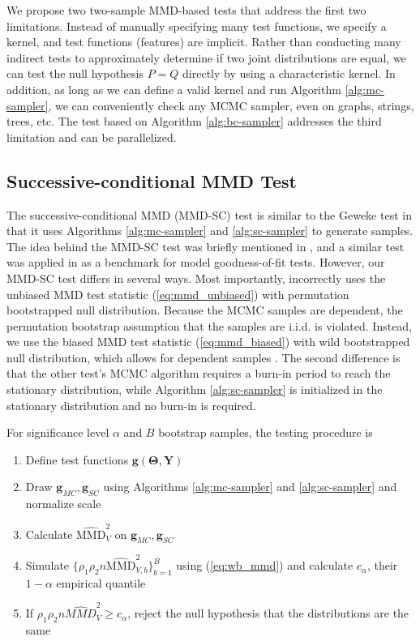 \documentclass[a4paper,11pt]{article}
\begin{document}
We propose two two-sample MMD-based tests that address the first two limitations. Instead of manually specifying many test functions, we specify a kernel, and test functions (features) are implicit. Rather than conducting many indirect tests to approximately determine if two joint distributions are equal, we can test the null hypothesis $P=Q$ directly by using a characteristic kernel. In addition, as long as we can define a valid kernel and run Algorithm \ref{alg:mc-sampler}, we can conveniently check any MCMC sampler, even on graphs, strings, trees, etc. The test based on Algorithm \ref{alg:bc-sampler} addresses the third limitation and can be parallelized.

\subsection{Successive-conditional MMD Test}
The successive-conditional MMD (MMD-SC) test is similar to the Geweke test in that it uses Algorithms \ref{alg:mc-sampler} and \ref{alg:sc-sampler} to generate samples. The idea behind the MMD-SC test was briefly mentioned in \cite{lloyd_statistical_nodate}, and a similar test was applied in \cite{liu_kernelized_nodate} as a benchmark for model goodness-of-fit tests. However, our MMD-SC test differs in several ways. Most importantly, \cite{liu_kernelized_nodate} incorrectly uses the unbiased MMD test statistic (\ref{eq:mmd_unbiased}) with permutation bootstrapped null distribution. Because the MCMC samples are dependent, the permutation bootstrap assumption that the samples are i.i.d. is violated. Instead, we use the biased MMD test statistic (\ref{eq:mmd_biased}) with wild bootstrapped null distribution, which allows for dependent samples \cite{chwialkowski_wild_2016}. The second difference is that the other test's MCMC algorithm requires a burn-in period to reach the stationary distribution, while Algorithm \ref{alg:sc-sampler} is initialized in the stationary distribution and no burn-in is required.

For significance level $\alpha$ and $B$ bootstrap samples, the testing procedure is
\begin{enumerate}
    \item Define test functions $\mathbf{g}(\mathbf{\Theta}, \mathbf{Y})$
    \item Draw $\mathbf{g}_{MC}, \mathbf{g}_{SC}$ using Algorithms \ref{alg:mc-sampler} and \ref{alg:sc-sampler} and normalize scale
    \item Calculate $\widehat{\mathrm{MMD}}_{V}^{2}$ on $\mathbf{g}_{MC}, \mathbf{g}_{SC}$
    \item Simulate $\{\rho_{1} \rho_{2} n \widehat{\mathrm{MMD}}^{2}_{V, b}\}_{b=1}^{B}$ using (\ref{eq:wb_mmd}) and calculate $c_{\alpha}$, their $1-\alpha$ empirical quantile
    \item If $\rho_{1} \rho_{2} n \widehat{MMD}^{2}_{V} \geq c_{\alpha}$, reject the null hypothesis that the distributions are the same
\end{enumerate}
\end{document}
